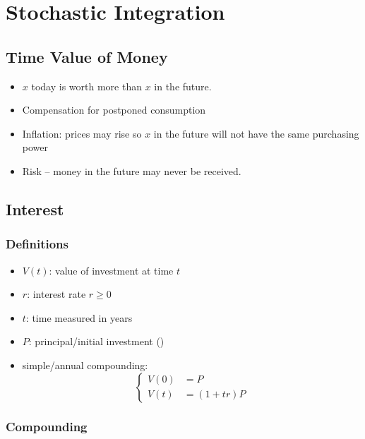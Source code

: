 \documentclass[twocolumn,landscape,10pt]{article}
\theoremstyle{definition}
\begin{document}
\section{Stochastic Integration}

\subsection{Time Value of Money}

\begin{itemize}
    \item \textsterling $x$ today is worth more than \textsterling $x$ in the
        future.
    \item Compensation for postponed consumption
    \item Inflation: prices may rise so \textsterling $x$ in the future will not
        have the same purchasing power
    \item Risk -- money in the future may never be received.
\end{itemize}

\subsection{Interest}

\subsubsection{Definitions}

\begin{itemize}
    \item $V(t)$: value of investment at time $t$
    \item $r$: interest rate $r\ge 0$
    \item $t$: time measured in years
    \item $P$: principal/initial investment (\textsterling)
    \item simple/annual compounding:
        \[
            \begin{cases}
                V(0) &= P \\
                V(t) &= (1 + tr) P
            \end{cases}
        \]
\end{itemize}

\subsubsection{Compounding}
\end{document}
